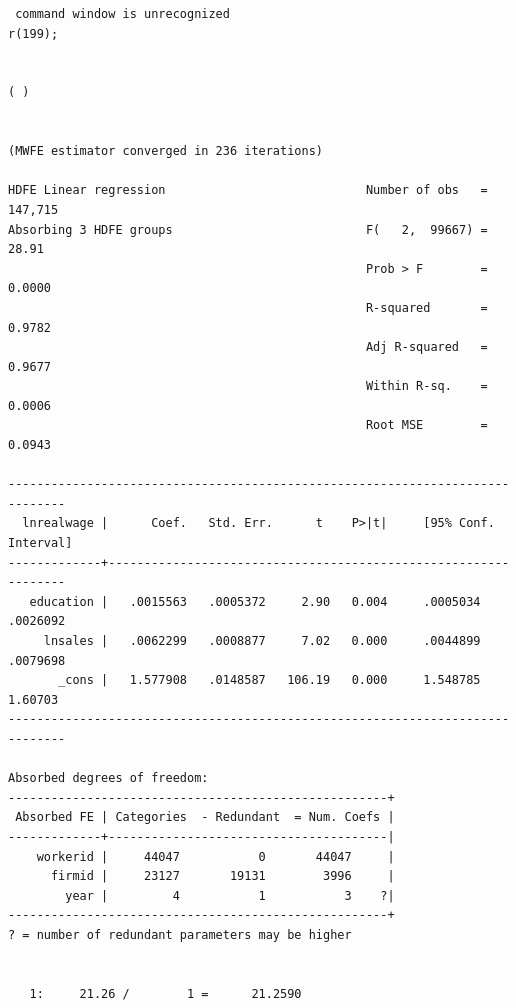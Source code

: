 \documentclass[
  12pt,
]{article}
\newenvironment{Shaded}{\begin{snugshade}}{\end{snugshade}}
\newcommand{\KeywordTok}[1]{\textcolor[rgb]{0.13,0.29,0.53}{\textbf{#1}}}
\newcommand{\NormalTok}[1]{#1}
\newcommand{\OperatorTok}[1]{\textcolor[rgb]{0.81,0.36,0.00}{\textbf{#1}}}
\newcommand{\StringTok}[1]{\textcolor[rgb]{0.31,0.60,0.02}{#1}}
\begin{document}
\begin{verbatim}
 command window is unrecognized
r(199);


( )


(MWFE estimator converged in 236 iterations)

HDFE Linear regression                            Number of obs   =    147,715
Absorbing 3 HDFE groups                           F(   2,  99667) =      28.91
                                                  Prob > F        =     0.0000
                                                  R-squared       =     0.9782
                                                  Adj R-squared   =     0.9677
                                                  Within R-sq.    =     0.0006
                                                  Root MSE        =     0.0943

------------------------------------------------------------------------------
  lnrealwage |      Coef.   Std. Err.      t    P>|t|     [95% Conf. Interval]
-------------+----------------------------------------------------------------
   education |   .0015563   .0005372     2.90   0.004     .0005034    .0026092
     lnsales |   .0062299   .0008877     7.02   0.000     .0044899    .0079698
       _cons |   1.577908   .0148587   106.19   0.000     1.548785     1.60703
------------------------------------------------------------------------------

Absorbed degrees of freedom:
-----------------------------------------------------+
 Absorbed FE | Categories  - Redundant  = Num. Coefs |
-------------+---------------------------------------|
    workerid |     44047           0       44047     |
      firmid |     23127       19131        3996     |
        year |         4           1           3    ?|
-----------------------------------------------------+
? = number of redundant parameters may be higher


   1:     21.26 /        1 =      21.2590
\end{verbatim}

\begin{Shaded}
\end{Shaded}
\end{document}
